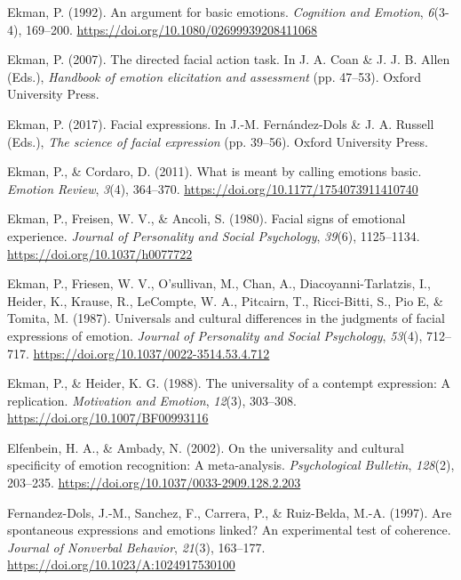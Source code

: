\documentclass[
  english,
  man]{apa7}
\newlength{\cslhangindent}
\newenvironment{cslreferences}%
  {\setlength{\parindent}{0pt}%
  \everypar{\setlength{\hangindent}{\cslhangindent}}\ignorespaces}%
  {\par}
\begin{document}
\begin{cslreferences}
\leavevmode\hypertarget{ref-ekman1992argument}{}%
Ekman, P. (1992). An argument for basic emotions. \emph{Cognition and Emotion}, \emph{6}(3-4), 169--200. \url{https://doi.org/10.1080/02699939208411068}

\leavevmode\hypertarget{ref-ekman2007directed}{}%
Ekman, P. (2007). The directed facial action task. In J. A. Coan \& J. J. B. Allen (Eds.), \emph{Handbook of emotion elicitation and assessment} (pp. 47--53). Oxford University Press.

\leavevmode\hypertarget{ref-ekman2017facial}{}%
Ekman, P. (2017). Facial expressions. In J.-M. Fernández-Dols \& J. A. Russell (Eds.), \emph{The science of facial expression} (pp. 39--56). Oxford University Press.

\leavevmode\hypertarget{ref-ekman2011meant}{}%
Ekman, P., \& Cordaro, D. (2011). What is meant by calling emotions basic. \emph{Emotion Review}, \emph{3}(4), 364--370. \url{https://doi.org/10.1177/1754073911410740}

\leavevmode\hypertarget{ref-ekman1980facial}{}%
Ekman, P., Freisen, W. V., \& Ancoli, S. (1980). Facial signs of emotional experience. \emph{Journal of Personality and Social Psychology}, \emph{39}(6), 1125--1134. \url{https://doi.org/10.1037/h0077722}

\leavevmode\hypertarget{ref-ekman1987universals}{}%
Ekman, P., Friesen, W. V., O'sullivan, M., Chan, A., Diacoyanni-Tarlatzis, I., Heider, K., Krause, R., LeCompte, W. A., Pitcairn, T., Ricci-Bitti, S., Pio E, \& Tomita, M. (1987). Universals and cultural differences in the judgments of facial expressions of emotion. \emph{Journal of Personality and Social Psychology}, \emph{53}(4), 712--717. \url{https://doi.org/10.1037/0022-3514.53.4.712}

\leavevmode\hypertarget{ref-ekman1988universality}{}%
Ekman, P., \& Heider, K. G. (1988). The universality of a contempt expression: A replication. \emph{Motivation and Emotion}, \emph{12}(3), 303--308. \url{https://doi.org/10.1007/BF00993116}

\leavevmode\hypertarget{ref-elfenbein2002universality}{}%
Elfenbein, H. A., \& Ambady, N. (2002). On the universality and cultural specificity of emotion recognition: A meta-analysis. \emph{Psychological Bulletin}, \emph{128}(2), 203--235. \url{https://doi.org/10.1037/0033-2909.128.2.203}

\leavevmode\hypertarget{ref-fernandez1997spontaneous}{}%
Fernandez-Dols, J.-M., Sanchez, F., Carrera, P., \& Ruiz-Belda, M.-A. (1997). Are spontaneous expressions and emotions linked? An experimental test of coherence. \emph{Journal of Nonverbal Behavior}, \emph{21}(3), 163--177. \url{https://doi.org/10.1023/A:1024917530100}


\end{cslreferences}
\end{document}
